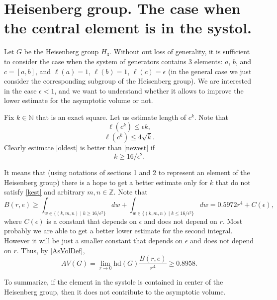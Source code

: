 \documentclass[11pt]{article}
\newcounter{razdel}[section]
\theoremstyle{Mystyle}
\newtheorem{Claim}[razdel]{Claim}
\begin{document}
\section{Heisenberg group. The case when the central element is in the systol.}

Let $G$ be the Heisenberg group $H_3$. Without out loss of generality, it is sufficient to consider the case when the system of generators contains 3 elements: $a$, $b$, and $c=[a,b]$, and $\ell(a)=1$, $\ell(b)=1$, $\ell(c)=\epsilon$ (in the general case we just consider the corresponding subgroup of the Heisenberg group). We are interested in the case $\epsilon<1$, and we want to understand whether it allows to improve the lower estimate for the asymptotic volume or not.

Fix $k\in\mathbb{N}$ that is an exact square. Let us estimate length of $c^{k}$. Note that 
\begin{equation}
\label{newest}
\ell(c^{k})\leq \epsilon k,
\end{equation}
\begin{equation}
\label{oldest}
\ell(c^{k})\leq 4\sqrt{k}.
\end{equation}
Clearly estimate \eqref{oldest} is better than \eqref{newest} if
\begin{equation}
\label{kest}
k\geq 16/\epsilon^2.
\end{equation}

It means that (using notations of sections 1 and 2 to represent an element of the Heisenberg group) there is a hope to get a better estimate only for $k$ that do not satisfy \eqref{kest} and arbitrary $m,n\in\mathbb{Z}$.
Note that
$$B(r,e)\geq\int_{w\in\{(k,m,n) \mid k\geq 16/\epsilon^2\}} dw + \int_{w\in\{(k,m,n) \mid k\leq 16/\epsilon^2\}} dw=
0.5972 r^4 + C(\epsilon),$$
where $C(\epsilon)$ is a constant that depends on $\epsilon$ and does not depend on $r$.
Most probably we are able to get a better lower estimate for the second integral. However it will be just a smaller constant that depends on $\epsilon$ and does not depend on $r$.
Thus, by \eqref{AsVolDef},
$$AV(G)=\lim_{r\rightarrow0} \mbox{hd}(G)\frac{B(r,e)}{r^{4}}\geq 0.8958.$$

To summarize, if the element in the systole is contained in center of the Heisenberg group, then it does not contribute to the asymptotic volume.

\end{document}
